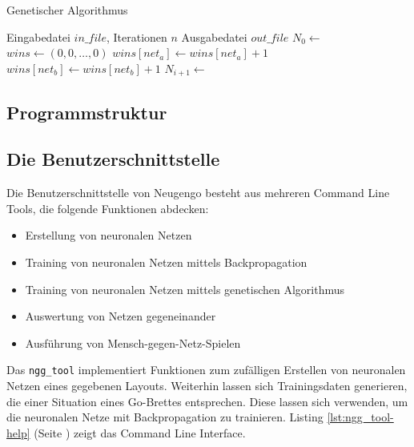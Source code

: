 \begin{algorithm}
    \caption{Genetischer Algorithmus}
    \label{alg:genetic}
    \begin{algorithmic}[1]
        \Require Eingabedatei $in\_file$, Iterationen $n$
        \Ensure Ausgabedatei $out\_file$
        \State $N_0 \gets$ 
            \State $wins \gets (0, 0, \ldots, 0)$
                \State {}
                    \State $wins[net_a] \gets wins[net_a] + 1$
                \Else
                    \State $wins[net_b] \gets wins[net_b] + 1$
                \EndIf
            \EndFor
            \State $N_{i+1} \gets$ 
        \EndFor
        \State {}
    \end{algorithmic}
\end{algorithm}

\subsection{Programmstruktur}

\subsection{Die Benutzerschnittstelle}
\begin{samepage}
Die Benutzerschnittstelle von Neugengo besteht aus mehreren Command Line Tools,
die folgende Funktionen abdecken:
\begin{itemize}
    \item Erstellung von neuronalen Netzen
    \item Training von neuronalen Netzen mittels Backpropagation
    \item Training von neuronalen Netzen mittels genetischen Algorithmus
    \item Auswertung von Netzen gegeneinander
    \item Ausführung von Mensch-gegen-Netz-Spielen
\end{itemize}
\end{samepage}

Das \texttt{ngg\_tool} implementiert Funktionen zum zufälligen Erstellen von
neuronalen Netzen eines gegebenen Layouts. Weiterhin lassen sich Trainingsdaten
generieren, die einer Situation eines Go-Brettes entsprechen. Diese lassen sich
verwenden, um die neuronalen Netze mit Backpropagation zu trainieren.
Listing \ref{lst:ngg_tool-help} (Seite \pageref{lst:ngg_tool-help}) zeigt das
Command Line Interface.

